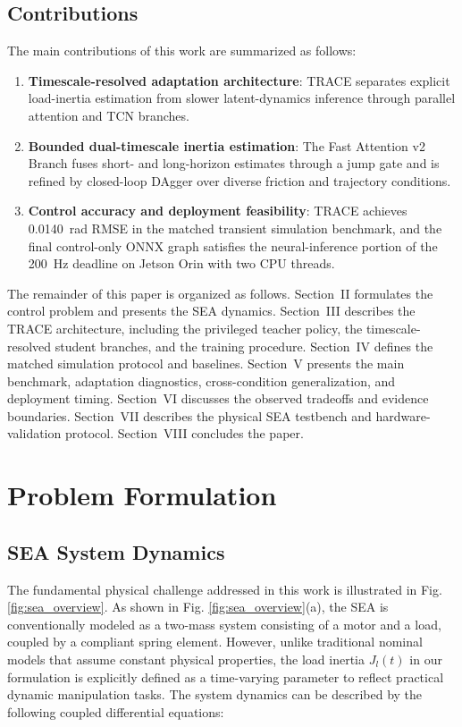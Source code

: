 \documentclass[letterpaper,journal]{IEEEtran}
\begin{document}
\subsection{Contributions}

The main contributions of this work are summarized as follows:

\begin{enumerate}
    \item \textbf{Timescale-resolved adaptation architecture}: TRACE separates explicit load-inertia estimation from slower latent-dynamics inference through parallel attention and TCN branches.

    \item \textbf{Bounded dual-timescale inertia estimation}: The Fast Attention v2 Branch fuses short- and long-horizon estimates through a jump gate and is refined by closed-loop DAgger over diverse friction and trajectory conditions.

    \item \textbf{Control accuracy and deployment feasibility}: TRACE achieves 0.0140~rad RMSE in the matched transient simulation benchmark, and the final control-only ONNX graph satisfies the neural-inference portion of the 200~Hz deadline on Jetson Orin with two CPU threads.
\end{enumerate}

The remainder of this paper is organized as follows. Section~II formulates the control problem and presents the SEA dynamics. Section~III describes the TRACE architecture, including the privileged teacher policy, the timescale-resolved student branches, and the training procedure. Section~IV defines the matched simulation protocol and baselines. Section~V presents the main benchmark, adaptation diagnostics, cross-condition generalization, and deployment timing. Section~VI discusses the observed tradeoffs and evidence boundaries. Section~VII describes the physical SEA testbench and hardware-validation protocol. Section~VIII concludes the paper.

\section{Problem Formulation}

\subsection{SEA System Dynamics}

The fundamental physical challenge addressed in this work is illustrated in Fig. \ref{fig:sea_overview}. As shown in Fig. \ref{fig:sea_overview}(a), the SEA is conventionally modeled as a two-mass system consisting of a motor and a load, coupled by a compliant spring element. However, unlike traditional nominal models that assume constant physical properties, the load inertia $J_l(t)$ in our formulation is explicitly defined as a time-varying parameter to reflect practical dynamic manipulation tasks. The system dynamics can be described by the following coupled differential equations:
\end{document}

